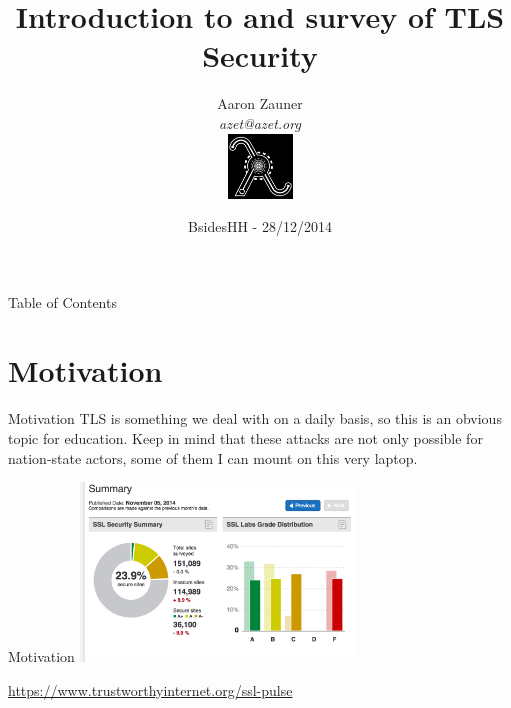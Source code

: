 \documentclass[hyperref={draft}]{beamer}
\title{Introduction to and survey of TLS Security}
\author[Aaron Zauner]{Aaron Zauner\\
	      \textit{azet@azet.org}\\
	      \includegraphics[height=65px,width=65px]{lambda}
       }
\institute{lambda.co.at:\\Highly-Available, Scalable \& Secure Distributed Systems}
\date{BsidesHH - 28/12/2014}
\begin{document}
{

\begin{frame}
  \titlepage
\end{frame}

}
\addtocounter{framenumber}{-1}

{

\begin{frame}{Table of Contents}
  \tableofcontents
\end{frame}

}
\addtocounter{framenumber}{-1}




\section{Motivation}

\begin{frame}{Motivation}
  TLS is something we deal with on a daily basis, so this is an obvious topic for education.
  \newline
  \newline
  Keep in mind that these attacks are not only possible for nation-state actors, some of them I can mount on this very laptop.
\end{frame}

\begin{frame}{Motivation}
    \includegraphics[height=180px]{sslpulse1}

    \vspace{10px}

    \tiny
    \url{https://www.trustworthyinternet.org/ssl-pulse}
\end{frame}
\end{document}
